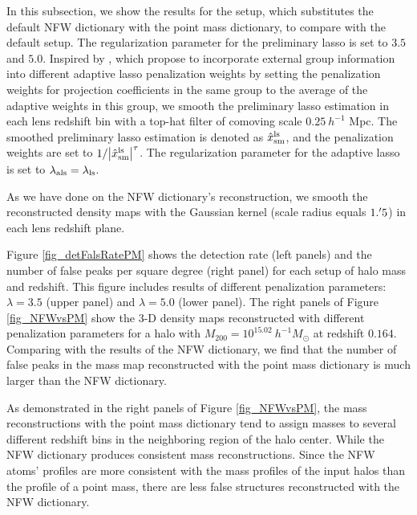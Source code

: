 
In this subsection, we show the results for the setup, which substitutes the
default NFW dictionary with the point mass dictionary, to compare with the
default setup.  The regularization parameter for the preliminary lasso is set
to $3.5$ and $5.0$.  Inspired by \citet{structureAdaLasso-Pramanik2020}, which
propose to incorporate external group information into different adaptive lasso
penalization weights by setting the penalization weights for projection
coefficients in the same group to the average of the adaptive weights in this
group, we smooth the preliminary lasso estimation in each lens redshift bin
with a top-hat filter of comoving scale $0.25~h^{-1}$ Mpc. The smoothed
preliminary lasso estimation is denoted as $\hat{x}^{\rm{ls}}_{\rm{sm}}$, and
the penalization weights are set to $1/\abs{\hat{x}^{\rm{ls}}_{\rm{sm}}}^\tau$.
The regularization parameter for the adaptive lasso is set to
$\lambda_{\rm{als}}=\lambda_{\rm{ls}}$.

As we have done on the NFW dictionary's reconstruction, we smooth the
reconstructed density maps with the Gaussian kernel (scale radius equals
$1.\mbox{$^\prime$} 5$) in each lens redshift plane.

Figure \ref{fig_detFalsRatePM} shows the detection rate (left panels) and the
number of false peaks per square degree (right panel) for each setup of halo
mass and redshift.
This figure includes results of different penalization parameters:
$\lambda=3.5$ (upper panel) and $\lambda=5.0$ (lower panel). The right panels
of Figure \ref{fig_NFWvsPM} show the $3$-D density maps reconstructed with
different penalization parameters for a halo with $M_{200}=10^{15.02}
~h^{-1}M_{\odot}$ at redshift $0.164$.
Comparing with the results of the NFW dictionary, we find that the number of
false peaks in the mass map reconstructed with the point mass dictionary is
much larger than the NFW dictionary.

As demonstrated in the right panels of Figure \ref{fig_NFWvsPM}, the mass
reconstructions with the point mass dictionary tend to assign masses to
several different redshift bins in the neighboring region of the halo center.
While the NFW dictionary produces consistent mass reconstructions.
Since the NFW atoms' profiles are more consistent with the mass profiles of the
input halos than the profile of a point mass, there are less false structures
reconstructed with the NFW dictionary.
